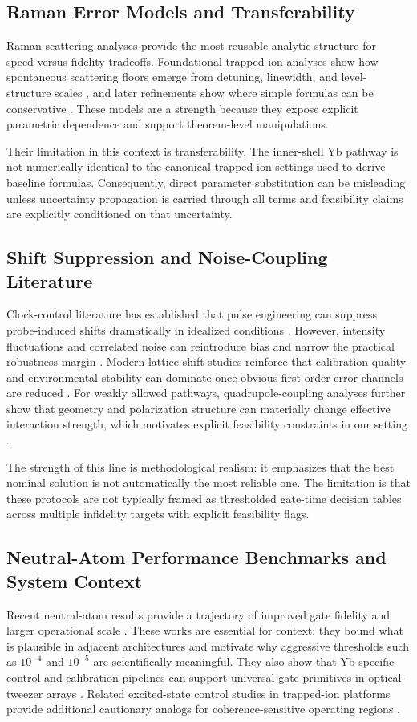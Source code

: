 \documentclass{article} %
\begin{document}
\subsection{Raman Error Models and Transferability}
Raman scattering analyses provide the most reusable analytic structure for speed-versus-fidelity tradeoffs. Foundational trapped-ion analyses show how spontaneous scattering floors emerge from detuning, linewidth, and level-structure scales \citep{S11}, and later refinements show where simple formulas can be conservative \citep{S12}. These models are a strength because they expose explicit parametric dependence and support theorem-level manipulations.

Their limitation in this context is transferability. The inner-shell Yb pathway is not numerically identical to the canonical trapped-ion settings used to derive baseline formulas. Consequently, direct parameter substitution can be misleading unless uncertainty propagation is carried through all terms and feasibility claims are explicitly conditioned on that uncertainty.

\subsection{Shift Suppression and Noise-Coupling Literature}
Clock-control literature has established that pulse engineering can suppress probe-induced shifts dramatically in idealized conditions \citep{S09}. However, intensity fluctuations and correlated noise can reintroduce bias and narrow the practical robustness margin \citep{S10}. Modern lattice-shift studies reinforce that calibration quality and environmental stability can dominate once obvious first-order error channels are reduced \citep{S16}. For weakly allowed pathways, quadrupole-coupling analyses further show that geometry and polarization structure can materially change effective interaction strength, which motivates explicit feasibility constraints in our setting \citep{S05}.

The strength of this line is methodological realism: it emphasizes that the best nominal solution is not automatically the most reliable one. The limitation is that these protocols are not typically framed as thresholded gate-time decision tables across multiple infidelity targets with explicit feasibility flags.

\subsection{Neutral-Atom Performance Benchmarks and System Context}
Recent neutral-atom results provide a trajectory of improved gate fidelity and larger operational scale \citep{S13,S14,S15,S20,S21}. These works are essential for context: they bound what is plausible in adjacent architectures and motivate why aggressive thresholds such as $10^{-4}$ and $10^{-5}$ are scientifically meaningful. They also show that Yb-specific control and calibration pipelines can support universal gate primitives in optical-tweezer arrays \citep{S22}. Related excited-state control studies in trapped-ion platforms provide additional cautionary analogs for coherence-sensitive operating regions \citep{S18,S19}.
\end{document}
